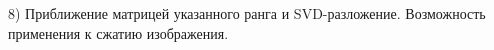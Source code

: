 8) Приближение матрицей указанного ранга и SVD-разложение. Возможность применения к сжатию изображения.
